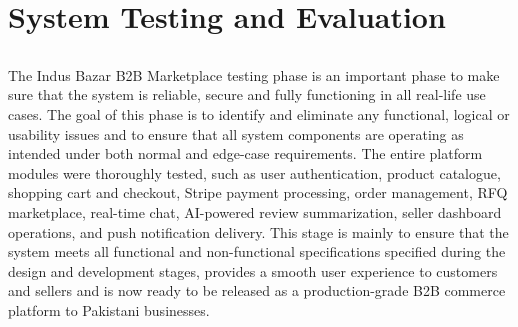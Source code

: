 \chapter{System Testing and Evaluation}\label{chap:testingEvaluation}


\section*{}
The Indus Bazar B2B Marketplace testing phase is an important phase to make sure that the system is reliable, secure and fully functioning in all real-life use cases. The goal of this phase is to identify and eliminate any functional, logical or usability issues and to ensure that all system components are operating as intended under both normal and edge-case requirements. The entire platform modules were thoroughly tested, such as user authentication, product catalogue, shopping cart and checkout, Stripe payment processing, order management, RFQ marketplace, real-time chat, AI-powered review summarization, seller dashboard operations, and push notification delivery. This stage is mainly to ensure that the system meets all functional and non-functional specifications specified during the design and development stages, provides a smooth user experience to customers and sellers and is now ready to be released as a production-grade B2B commerce platform to Pakistani businesses.

